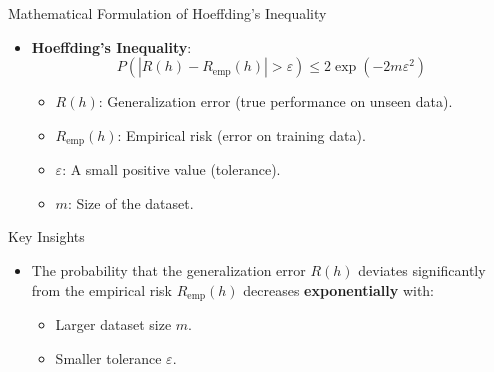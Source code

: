 \documentclass[
  ignorenonframetext,
]{beamer}
\providecommand{\tightlist}{%
  \setlength{\itemsep}{0pt}\setlength{\parskip}{0pt}}\usepackage{longtable,booktabs,array}
\begin{document}
\begin{frame}{Mathematical Formulation of Hoeffding's Inequality}
\label{mathematical-formulation-of-hoeffdings-inequality}
\begin{itemize}
\tightlist
\item
  \textbf{Hoeffding's Inequality}: \[
  P(|R(h) - R_{\text{emp}}(h)| > \varepsilon) \leq 2 \exp(-2m\varepsilon^2)
  \]

  \begin{itemize}
  \tightlist
  \item
    \(R(h)\): Generalization error (true performance on unseen data).
  \item
    \(R_{\text{emp}}(h)\): Empirical risk (error on training data).
  \item
    \(\varepsilon\): A small positive value (tolerance).
  \item
    \(m\): Size of the dataset.
  \end{itemize}
\end{itemize}
\end{frame}

\begin{frame}
\begin{block}{Key Insights}
\label{key-insights-1}
\begin{itemize}
\tightlist
\item
  The probability that the generalization error \(R(h)\) deviates
  significantly from the empirical risk \(R_{\text{emp}}(h)\) decreases
  \textbf{exponentially} with:

  \begin{itemize}
  \tightlist
  \item
    Larger dataset size \(m\).
  \item
    Smaller tolerance \(\varepsilon\).
  \end{itemize}
\end{itemize}
\end{block}
\end{frame}
\end{document}
